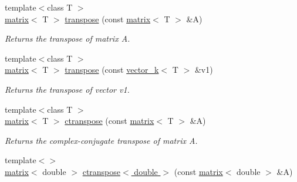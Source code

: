 \begin{DoxyCompactItemize}
\item 
\hypertarget{namespacekeycpp_a7fd5ce0385e9cc7bed5b44ed8475e8aa}{{\footnotesize template$<$class T $>$ }\\\hyperlink{classkeycpp_1_1matrix}{matrix}$<$ T $>$ \hyperlink{namespacekeycpp_a7fd5ce0385e9cc7bed5b44ed8475e8aa}{transpose} (const \hyperlink{classkeycpp_1_1matrix}{matrix}$<$ T $>$ \&A)}\label{namespacekeycpp_a7fd5ce0385e9cc7bed5b44ed8475e8aa}

\begin{DoxyCompactList}\small\item\em Returns the transpose of matrix A. \end{DoxyCompactList}\item 
\hypertarget{namespacekeycpp_a24d241b78ac9d5764e08c3f03bdffd07}{{\footnotesize template$<$class T $>$ }\\\hyperlink{classkeycpp_1_1matrix}{matrix}$<$ T $>$ \hyperlink{namespacekeycpp_a24d241b78ac9d5764e08c3f03bdffd07}{transpose} (const \hyperlink{classkeycpp_1_1vector__k}{vector\-\_\-k}$<$ T $>$ \&v1)}\label{namespacekeycpp_a24d241b78ac9d5764e08c3f03bdffd07}

\begin{DoxyCompactList}\small\item\em Returns the transpose of vector v1. \end{DoxyCompactList}\item 
\hypertarget{namespacekeycpp_a14503c0419f365433d88fa081d473210}{{\footnotesize template$<$class T $>$ }\\\hyperlink{classkeycpp_1_1matrix}{matrix}$<$ T $>$ \hyperlink{namespacekeycpp_a14503c0419f365433d88fa081d473210}{ctranspose} (const \hyperlink{classkeycpp_1_1matrix}{matrix}$<$ T $>$ \&A)}\label{namespacekeycpp_a14503c0419f365433d88fa081d473210}

\begin{DoxyCompactList}\small\item\em Returns the complex-\/conjugate transpose of matrix A. \end{DoxyCompactList}\item 
\hypertarget{namespacekeycpp_a9fc1e2c9bf6ee79ee28a6f25b7b55b23}{{\footnotesize template$<$$>$ }\\\hyperlink{classkeycpp_1_1matrix}{matrix}$<$ double $>$ \hyperlink{namespacekeycpp_a9fc1e2c9bf6ee79ee28a6f25b7b55b23}{ctranspose$<$ double $>$} (const \hyperlink{classkeycpp_1_1matrix}{matrix}$<$ double $>$ \&A)}\label{namespacekeycpp_a9fc1e2c9bf6ee79ee28a6f25b7b55b23}


\end{DoxyCompactItemize}
